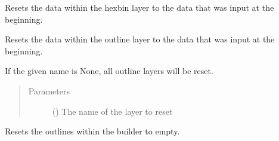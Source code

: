 \documentclass[letterpaper,10pt,english]{sphinxmanual}
\begin{document}
\begin{fulllineitems}
\begin{fulllineitems}
\end{fulllineitems}


\begin{fulllineitems}
\label{\detokenize{builder:geohexviz.builder.PlotBuilder.reset_hexbin_data}}
\sphinxAtStartPar
Resets the data within the hexbin layer to the data that was input at the beginning.

\end{fulllineitems}


\begin{fulllineitems}
\label{\detokenize{builder:geohexviz.builder.PlotBuilder.reset_outline_data}}
\sphinxAtStartPar
Resets the data within the outline layer to the data that was input at the beginning.

\sphinxAtStartPar
If the given name is None, all outline layers will be reset.
\begin{quote}\begin{description}
\item[{Parameters}] \leavevmode
\sphinxAtStartPar
{} () \textendash{} The name of the layer to reset

\end{description}\end{quote}

\end{fulllineitems}


\begin{fulllineitems}
\label{\detokenize{builder:geohexviz.builder.PlotBuilder.reset_outlines}}
\sphinxAtStartPar
Resets the outlines within the builder to empty.


\end{fulllineitems}
\end{fulllineitems}
\end{document}
